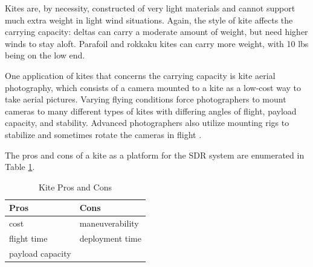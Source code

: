 Kites are, by necessity, constructed of very light materials and cannot support much extra weight in light wind situations. Again, the style of kite affects the carrying capacity: deltas can carry a moderate amount of weight, but need higher winds to stay aloft. Parafoil and rokkaku kites can carry more weight, with 10 lbs being on the low end.\par
One application of kites that concerns the carrying capacity is kite aerial photography, which consists of a camera mounted to a kite as a low-cost way to take aerial pictures. Varying flying conditions force photographers to mount cameras to many different types of kites with differing angles of flight, payload capacity, and stability. Advanced photographers also utilize mounting rigs to stabilize and sometimes rotate the cameras in flight \cite{kite_iqp}.\par
The pros and cons of a kite as a platform for the SDR system are enumerated in Table \ref{table:kite_pc}.
\begin{table}[ht]
\centering
\caption{Kite Pros and Cons}
\label{table:kite_pc}
\begin{tabular}{l|l}
  Pros & Cons \\ \hline
  cost & maneuverability \\
  flight time & deployment time \\
  payload capacity & \\
\end{tabular}
\end{table}\par

